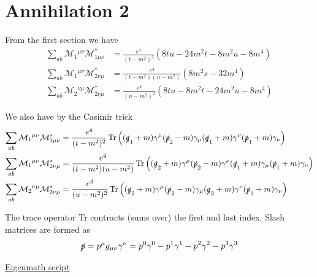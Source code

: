 

\section*{Annihilation 2}

From the first section we have
\begin{align*}
\sum_{ab}\mathcal M_1{}^{\mu\nu}\mathcal M^*_{1\mu\nu}
&=\frac{e^4}{(t-m^2)^2}
\left(8 t u - 24 m^2 t - 8 m^2 u - 8 m^4\right)
\\
\sum_{ab}\mathcal M_1{}^{\mu\nu}\mathcal M^*_{2\nu\mu}
&=\frac{e^4}{(t-m^2)(u-m^2)}
\left(8 m^2 s - 32 m^4\right)
\\
\sum_{ab}\mathcal M_2{}^{\nu\mu}\mathcal M^*_{2\nu\mu}
&=\frac{e^4}{(u-m^2)^2}
\left(8 t u - 8 m^2 t - 24 m^2 u - 8 m^4\right)
\end{align*}

We also have by the Casimir trick
\begin{align*}
\sum_{ab}\mathcal M_1{}^{\mu\nu}\mathcal M^*_{1\mu\nu}
&=\frac{e^4}{(t-m^2)^2}\operatorname{Tr}
\left(
(\slashed q_1+m)\gamma^\mu(\slashed p_2-m)\gamma_\mu(\slashed q_1+m)\gamma^\nu(\slashed p_1+m)\gamma_\nu
\right)
\\
\sum_{ab}\mathcal M_1{}^{\mu\nu}\mathcal M^*_{2\nu\mu}
&=\frac{e^4}{(t-m^2)(u-m^2)}\operatorname{Tr}
\left(
(\slashed q_2+m)\gamma^\mu(\slashed p_2-m)\gamma^\nu(\slashed q_1+m)\gamma_\mu(\slashed p_1+m)\gamma_\nu
\right)
\\
\sum_{ab}\mathcal M_2{}^{\nu\mu}\mathcal M^*_{2\nu\mu}
&=\frac{e^4}{(u-m^2)^2}\operatorname{Tr}
\left(
(\slashed q_2+m)\gamma^\mu(\slashed p_2-m)\gamma_\mu(\slashed q_2+m)\gamma^\nu(\slashed p_1+m)\gamma_\nu
\right)
\end{align*}

The trace operator Tr contracts (sums over) the first and last index.
Slash matrices are formed as
\begin{equation*}
\slashed p=p^\mu g_{\mu\nu}\gamma^\nu
=p^0\gamma^0-p^1\gamma^1-p^2\gamma^2-p^3\gamma^3
\end{equation*}

\href{https://georgeweigt.github.io/examples/annihilation-2-demo.html}{Eigenmath script}


